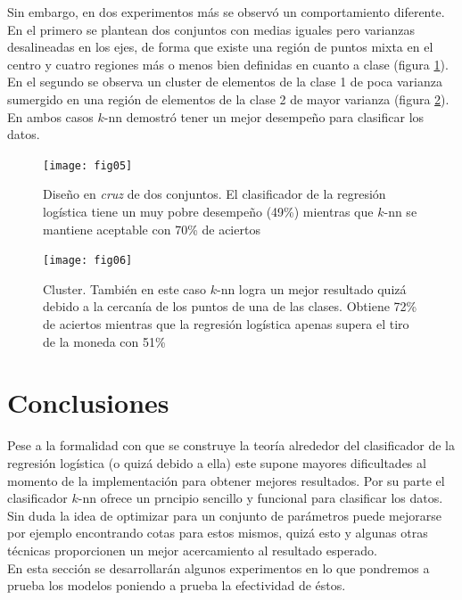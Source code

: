 \documentclass[11pt,letterpaper,reqno]{article}
\begin{document}
Sin embargo, en dos experimentos más se observó un comportamiento diferente. En el primero se plantean dos conjuntos con medias iguales pero varianzas desalineadas en los ejes, de forma que existe una región de puntos mixta en el centro y cuatro regiones más o menos bien definidas en cuanto a clase (figura \ref{fig:fig05}). En el segundo se observa un cluster de elementos de la clase 1 de poca varianza sumergido en una región de elementos de la clase 2 de mayor varianza (figura \ref{fig:fig06}). En ambos casos $k$-nn demostró tener un mejor desempeño para clasificar los datos.

\begin{figure}[h]
	\begin{center}
		\texttt{[image: fig05]}
	\end{center}
	\caption{Diseño en \textit{cruz} de dos conjuntos. El clasificador de la regresión logística tiene un muy pobre desempeño (49\%) mientras que $k$-nn se mantiene aceptable con 70\% de aciertos}
	\label{fig:fig05}
\end{figure}

\begin{figure}[h]
	\begin{center}
		\texttt{[image: fig06]}
	\end{center}
	\caption{Cluster. También en este caso $k$-nn logra un mejor resultado quizá debido a la cercanía de los puntos de una de las clases. Obtiene 72\% de aciertos mientras que la regresión logística apenas supera el tiro de la moneda con 51\%}
	\label{fig:fig06}
\end{figure}

\section{Conclusiones}

Pese a la formalidad con que se construye la teoría alrededor del clasificador de la regresión logística (o quizá debido a ella) este supone mayores dificultades al momento de la implementación para obtener mejores resultados. Por su parte el clasificador $k$-nn ofrece un prncipio sencillo y funcional para clasificar los datos.\\

Sin duda la idea de optimizar para un conjunto de parámetros puede mejorarse por ejemplo encontrando cotas para estos mismos, quizá esto y algunas otras técnicas proporcionen un mejor acercamiento al resultado esperado.\\

En esta sección se desarrollarán algunos experimentos en lo que pondremos a prueba los modelos poniendo a prueba la efectividad de éstos. \cite{gitEnlace}

\clearpage



\end{document}
